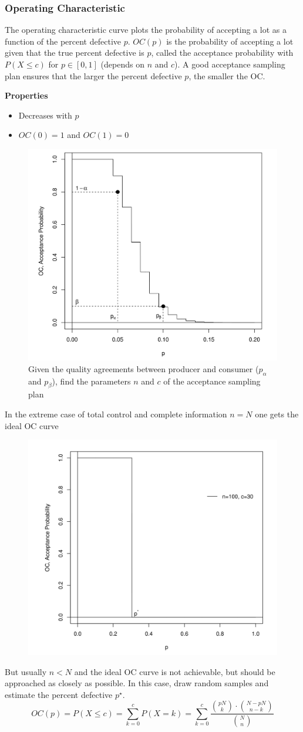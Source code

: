 \documentclass[11pt]{article}
\theoremstyle{definition}
\begin{document}
\subsubsection{Operating Characteristic}
The operating characteristic curve plots the probability of accepting a lot as a function of the percent defective $p$. $OC(p)$ is the probability of accepting a lot given that the true percent defective is $p$, called the acceptance probability with $P(X\leq c)$ for $p\in[0,1]$ (depends on $n$ and $c$). A good acceptance sampling plan ensures that the larger the percent
defective $p$, the smaller the OC.

\vspace{0.5em}
\noindent
\textbf{Properties}
\begin{itemize}
	\item Decreases with $p$
	\item $OC(0) = 1$ and $OC(1) = 0$
\end{itemize}

\begin{figure}[H]
	\centering
	\includegraphics[width=0.5\linewidth]{img/operating_characteristic_curve}
	\caption{Given the quality agreements between producer and consumer ($p_{\alpha}$ and $p_{\beta}$), find the parameters $n$ and $c$ of the acceptance sampling plan}
	\label{fig:operatingcharacteristiccurve}
\end{figure}

In the extreme case of total control and complete information $n=N$ one gets the ideal OC curve
\begin{figure}[H]
	\centering
	\includegraphics[width=0.5\linewidth]{img/ideal_OC_curve}
\end{figure}
But usually $n<N$ and the ideal OC curve is not achievable, but should be approached as closely as possible. In this case, draw random samples and estimate the percent defective $p^\star$.
\begin{equation*}
	OC(p) = P(X\leq c) = \sum_{k=0}^c P(X=k) = \sum_{k=0}^c \frac{\binom{pN}{k}\cdot\binom{N-pN}{n - k}}{\binom{N}{n}}
\end{equation*}
\end{document}
